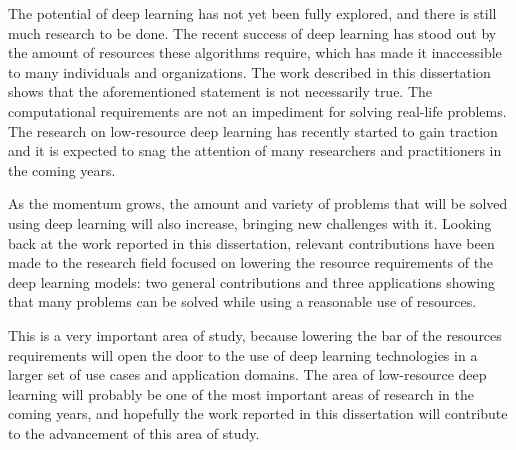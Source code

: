 The potential of deep learning has not yet been fully explored, and there is still much research to be done. The recent success of deep learning has stood out by the amount of resources these algorithms require, which has made it inaccessible to many individuals and organizations. The work described in this dissertation shows that the aforementioned statement is not necessarily true. The computational requirements are not an impediment for solving real-life problems. The research on low-resource deep learning has recently started to gain traction and it is expected to snag the attention of many researchers and practitioners in the coming years. 

As the momentum grows, the amount and variety of problems that will be solved using deep learning will also increase, bringing new challenges with it. Looking back at the work reported in this dissertation, relevant contributions have been made to the research field focused on lowering the resource requirements of the deep learning models: two general contributions and three applications showing that many problems can be solved while using a reasonable use of resources. 

This is a very important area of study, because lowering the bar of the resources requirements will open the door to the use of deep learning technologies in a larger set of use cases and application domains.  The area of low-resource deep learning will probably be one of the most important areas of research in the coming years, and hopefully the work reported in this dissertation will contribute to the advancement of this area of study.

